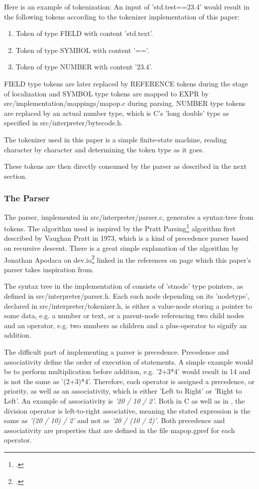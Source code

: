 \documentclass[12pt,a4paper,man]{apa7}
\begin{document}
Here is an example of tokenization:
An input of 'std.test==23.4' would result in the following tokens according
to the tokenizer implementation of this paper:
\begin{enumerate}
    \item Token of type FIELD with content 'std.text'.
    \item Token of type SYMBOL with content '=='.
    \item Token of type NUMBER with content '23.4'.
\end{enumerate}
FIELD type tokens are later replaced by REFERENCE tokens during the stage of localization
and SYMBOL type tokens are mapped to EXPR by src/implementation/mappings/mapop.c
during parsing. NUMBER type tokens are replaced by an actual number type, which
is C's 'long double' type as specified in src/interpreter/bytecode.h.

The tokenizer used in this paper is a simple finite-state machine, reading
character by character and determining the token type as it goes.

These tokens are then directly consumed by the parser as described in the next
section.

\subsubsection{The Parser}
The parser, implemented in src/interpreter/parser.c, generates a syntax-tree
from tokens. The algorithm used is inspired by the Pratt Parsing\footcite{pratt}
algorithm first described by Vaughan Pratt in 1973, which is a kind of precedence
parser based on recursive descent. There is a great simple explanation of the algorithm
by Jonathan Apodaca on dev.io\footcite{devio} linked in the references on page 
\pageref{bibliography} which this paper's parser takes inspiration from.

The syntax tree in the implementation of \name consists of 'stnode' type
pointers, as defined in src/interpreter/parser.h. Each such node depending
on its 'nodetype', declared in src/interpreter/tokenizer.h,
is either a value-node storing a pointer to some data, e.g. a number or text, or a
parent-node referencing two child nodes and an operator, e.g. two numbers as
children and a plus-operator to signify an addition.

The difficult part of implementing a parser is precedence. Precedence and
associativity define the order of execution of statements. A simple example
would be to perform multiplication before addition, e.g. '2+3*4' would
result in 14 and is not the same as '(2+3)*4'. Therefore, each operator is
assigned a precedence, or priority, as well as an associativity, which is
either 'Left to Right' or 'Right to Left'. An example of associativity is
\emph{'20 / 10 / 2'}. Both in C as well as in \name, the division operator is
left-to-right associative, meaning the stated expression is the same as
\emph{'(20 / 10) / 2'} and not as \emph{'20 / (10 / 2)'}. Both precedence 
and associativity are properties that are defined in the file mapop.gpref for
each operator.
\end{document}
